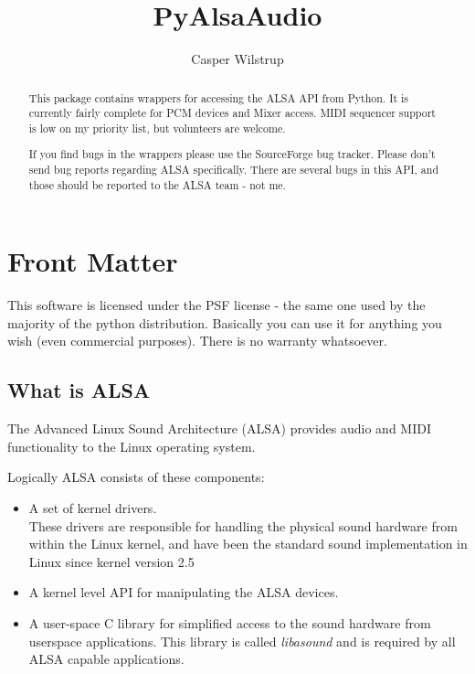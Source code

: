 \documentclass{howto}
\title{PyAlsaAudio}
\author{Casper Wilstrup}
\begin{document}
\maketitle

%
\ifhtml
\chapter*{Front Matter\label{front}}
\fi

This software is licensed under the PSF license - the same one used
by the majority of the python distribution. Basically you can use it
for anything you wish (even commercial purposes). There is no warranty
whatsoever.

\begin{abstract}
\noindent
This package contains wrappers for accessing the ALSA API from Python.
It is currently fairly complete for PCM devices and Mixer access. MIDI
sequencer support is low on my priority list, but volunteers are
welcome.

If you find bugs in the wrappers please use the SourceForge bug
tracker. Please don't send bug reports regarding ALSA specifically.
There are several bugs in this API, and those should be reported to
the ALSA team - not me.
\end{abstract}

\tableofcontents

\section{What is ALSA}

The Advanced Linux Sound Architecture (ALSA) provides audio and MIDI
functionality to the Linux operating system.

Logically ALSA consists of these components:
\begin{itemize}
  \item A set of kernel drivers.\\
        These drivers are responsible for handling the physical sound 
        hardware from within the Linux kernel, and have been the standard
        sound implementation in Linux since kernel version 2.5
  \item A kernel level API for manipulating the ALSA devices.
  \item A user-space C library for simplified access to the sound hardware
        from userspace applications. This library is called \textit{libasound}
        and is required by all ALSA capable applications.
\end{itemize}
\end{document}
